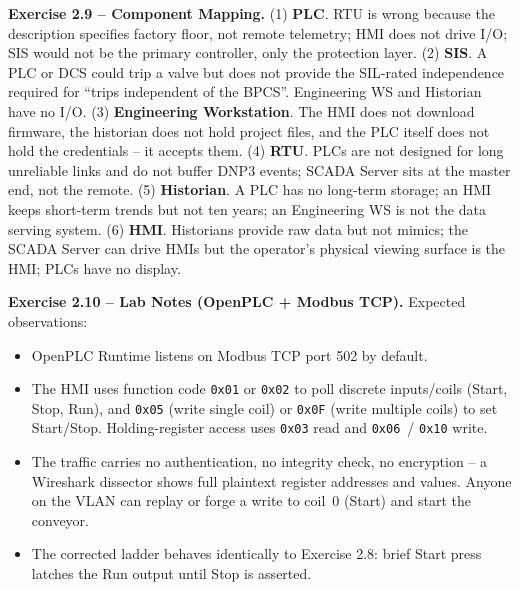 \documentclass[11pt,a4paper]{article}
\begin{document}
\begin{solutionbox}
\textbf{Exercise 2.9 -- Component Mapping.}
(1) \textbf{PLC}. RTU is wrong because the description specifies factory
floor, not remote telemetry; HMI does not drive I/O; SIS would not be
the primary controller, only the protection layer.
(2) \textbf{SIS}. A PLC or DCS could trip a valve but does not provide
the SIL-rated independence required for ``trips independent of the
BPCS''. Engineering WS and Historian have no I/O.
(3) \textbf{Engineering Workstation}. The HMI does not download firmware,
the historian does not hold project files, and the PLC itself does not
hold the credentials -- it accepts them.
(4) \textbf{RTU}. PLCs are not designed for long unreliable links and do
not buffer DNP3 events; SCADA Server sits at the master end, not the
remote.
(5) \textbf{Historian}. A PLC has no long-term storage; an HMI keeps
short-term trends but not ten years; an Engineering WS is not the data
serving system.
(6) \textbf{HMI}. Historians provide raw data but not mimics; the
SCADA Server can drive HMIs but the operator's physical viewing surface
is the HMI; PLCs have no display.
\end{solutionbox}

\begin{solutionbox}
\textbf{Exercise 2.10 -- Lab Notes (OpenPLC + Modbus TCP).}
Expected observations:
\begin{itemize}
  \item OpenPLC Runtime listens on Modbus TCP port 502 by default.
  \item The HMI uses function code \texttt{0x01} or \texttt{0x02} to poll
    discrete inputs/coils (Start, Stop, Run), and \texttt{0x05} (write
    single coil) or \texttt{0x0F} (write multiple coils) to set Start/Stop.
    Holding-register access uses \texttt{0x03} read and \texttt{0x06}~/
    \texttt{0x10} write.
  \item The traffic carries no authentication, no integrity check, no
    encryption -- a Wireshark dissector shows full plaintext register
    addresses and values. Anyone on the VLAN can replay or forge a
    write to coil~0 (Start) and start the conveyor.
  \item The corrected ladder behaves identically to Exercise 2.8: brief
    Start press latches the Run output until Stop is asserted.
\end{itemize}
\end{solutionbox}
\end{document}
